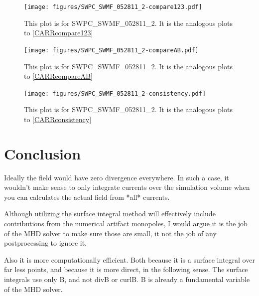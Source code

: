 \documentclass{article}
\begin{document}
\begin{figure}[H]
  \texttt{[image: figures/SWPC\_SWMF\_052811\_2-compare123.pdf]}
  \caption{
  This plot is for SWPC\_SWMF\_052811\_2.
  It is the analogous plots to \ref{CARRcompare123}
  }
  \label{SWPCcompare123}
\end{figure}

\begin{figure}[H]
  \texttt{[image: figures/SWPC\_SWMF\_052811\_2-compareAB.pdf]}
  \caption{
  This plot is for SWPC\_SWMF\_052811\_2.
  It is the analogous plots to \ref{CARRcompareAB}
  }
  \label{SWPCcompareAB}
\end{figure}

\begin{figure}[H]
  \texttt{[image: figures/SWPC\_SWMF\_052811\_2-consistency.pdf]}
  \caption{
  This plot is for SWPC\_SWMF\_052811\_2.
  It is the analogous plots to \ref{CARRconsistency}
  }
  \label{SWPCconsistency}
\end{figure}


\section{Conclusion}

Ideally the field would have zero divergence everywhere.
In such a case, it wouldn't make sense to only integrate currents over the simulation volume when you can calculates the actual field from *all* currents.

Although utilizing the surface integral method will effectively include contributions from the numerical artifact monopoles, I would argue it is the job of the MHD solver to make sure those are small, it not the job of any postprocessing to ignore it.

Also it is more computationally efficient. Both because it is a surface integral over far less points,
and because it is more direct, in the following sense. The surface integrals
use only B, and not divB or curlB. B is already a fundamental variable of the MHD solver.
\end{document}
